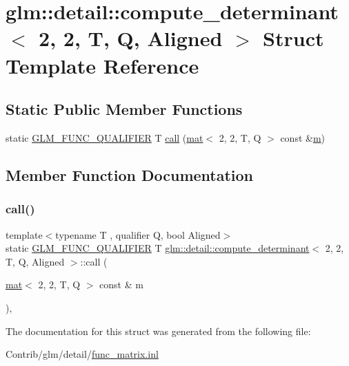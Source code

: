 \hypertarget{structglm_1_1detail_1_1compute__determinant_3_012_00_012_00_01_t_00_01_q_00_01_aligned_01_4}{}\section{glm\+:\+:detail\+:\+:compute\+\_\+determinant$<$ 2, 2, T, Q, Aligned $>$ Struct Template Reference}
\label{structglm_1_1detail_1_1compute__determinant_3_012_00_012_00_01_t_00_01_q_00_01_aligned_01_4}
\subsection*{Static Public Member Functions}
\begin{DoxyCompactItemize}
\item 
static \mbox{\hyperlink{setup_8hpp_a33fdea6f91c5f834105f7415e2a64407}{G\+L\+M\+\_\+\+F\+U\+N\+C\+\_\+\+Q\+U\+A\+L\+I\+F\+I\+ER}} T \mbox{\hyperlink{structglm_1_1detail_1_1compute__determinant_3_012_00_012_00_01_t_00_01_q_00_01_aligned_01_4_a850cf8b2da3cde11c2b1c3c972927d6d}{call}} (\mbox{\hyperlink{structglm_1_1mat}{mat}}$<$ 2, 2, T, Q $>$ const \&\mbox{\hyperlink{_s_d_l__opengl__glext_8h_af593500c283bf1a787a6f947f503a5c2}{m}})
\end{DoxyCompactItemize}


\subsection{Member Function Documentation}
\mbox{\label{structglm_1_1detail_1_1compute__determinant_3_012_00_012_00_01_t_00_01_q_00_01_aligned_01_4_a850cf8b2da3cde11c2b1c3c972927d6d}} 
\subsubsection{\texorpdfstring{call()}{call()}}
{\footnotesize\ttfamily template$<$typename T , qualifier Q, bool Aligned$>$ \\
static \mbox{\hyperlink{setup_8hpp_a33fdea6f91c5f834105f7415e2a64407}{G\+L\+M\+\_\+\+F\+U\+N\+C\+\_\+\+Q\+U\+A\+L\+I\+F\+I\+ER}} T \mbox{\hyperlink{structglm_1_1detail_1_1compute__determinant}{glm\+::detail\+::compute\+\_\+determinant}}$<$ 2, 2, T, Q, Aligned $>$\+::call (\begin{DoxyParamCaption}\item[{\mbox{\hyperlink{structglm_1_1mat}{mat}}$<$ 2, 2, T, Q $>$ const \&}]{m }\end{DoxyParamCaption})\hspace{0.3cm}{\ttfamily [inline]}, {\ttfamily [static]}}



The documentation for this struct was generated from the following file\+:\begin{DoxyCompactItemize}
\item 
Contrib/glm/detail/\mbox{\hyperlink{func__matrix_8inl}{func\+\_\+matrix.\+inl}}\end{DoxyCompactItemize}
